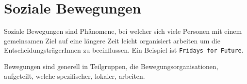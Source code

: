 \documentclass{article}
\begin{document}
\section{Soziale Bewegungen}
Soziale Bewegungen sind Phänomene, bei welcher sich viele Personen mit einem gemeinsamen Ziel auf eine längere Zeit leicht organisiert arbeiten um die EntscheidungsträgerInnen zu beeinflussen. Ein Beispiel ist \texttt{Fridays for Future}.
 
Bewegungen sind generell in Teilgruppen, die Bewegungsorganisationen, aufgeteilt, welche spezifischer, lokaler, arbeiten. 
\end{document}
